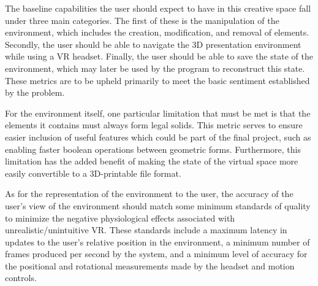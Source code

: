 \documentclass[onecolumn, draftclsnofoot,10pt, compsoc]{IEEEtran}
\begin{document}
The baseline capabilities the user should expect to have in this creative space fall under three main categories.
The first of these is the manipulation of the environment, which includes the creation, modification, and removal of elements.
Secondly, the user should be able to navigate the 3D presentation environment while using a VR headset.
Finally, the user should be able to save the state of the environment, which may later be used by the program to reconstruct this state.
These metrics are to be upheld primarily to meet the basic sentiment established by the problem.

For the environment itself, one particular limitation that must be met is that the elements it contains must always form legal solids.
This metric serves to ensure easier inclusion of useful features which could be part of the final project, such as enabling faster boolean operations between geometric forms.
Furthermore, this limitation has the added benefit of making the state of the virtual space more easily convertible to a 3D-printable file format.

As for the representation of the environment to the user, the accuracy of the user’s view of the environment should match some minimum standards of quality to minimize the negative physiological effects associated with unrealistic/unintuitive VR.
These standards include a maximum latency in updates to the user’s relative position in the environment, a minimum number of frames produced per second by the system, and a minimum level of accuracy for the positional and rotational measurements made by the headset and motion controls.
\end{document}
